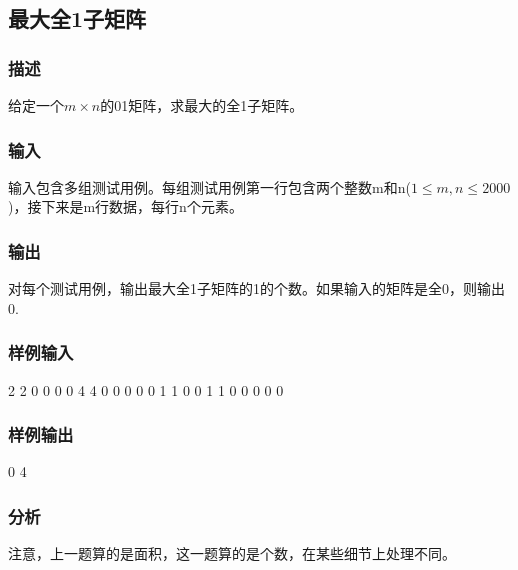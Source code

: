 \subsection{最大全1子矩阵}
\subsubsection{描述}
给定一个$m \times n$的01矩阵，求最大的全1子矩阵。

\subsubsection{输入}
输入包含多组测试用例。每组测试用例第一行包含两个整数m和n($1 \leq m,n \leq 2000$)，接下来是m行数据，每行n个元素。

\subsubsection{输出}
对每个测试用例，输出最大全1子矩阵的1的个数。如果输入的矩阵是全0，则输出0.

\subsubsection{样例输入}
\begin{Code}
2 2
0 0
0 0
4 4
0 0 0 0
0 1 1 0
0 1 1 0
0 0 0 0
\end{Code}

\subsubsection{样例输出}
\begin{Code}
0
4
\end{Code}

\subsubsection{分析}
注意，上一题算的是面积，这一题算的是个数，在某些细节上处理不同。

